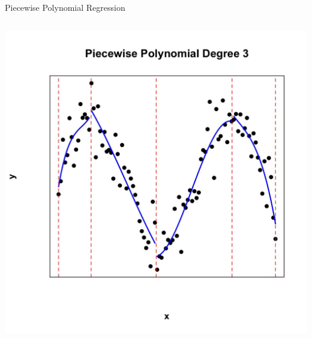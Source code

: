\documentclass[english]{beamer}
\begin{document}
\begin{frame}{Piecewise Polynomial Regression}
\begin{columns}
\begin{column}{0.47\textwidth}
            \includegraphics[width=\linewidth]{images/piecewise_degree_3.jpeg} 
        \end{column}
    \end{columns}  
\end{frame}
\end{document}
